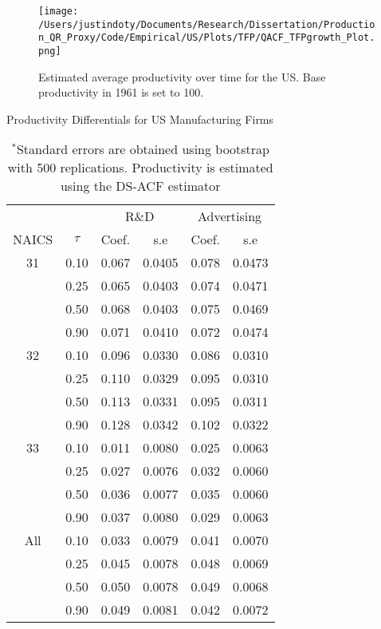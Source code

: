 \documentclass[11pt]{article}
\begin{document}
\begin{figure}[H]
\centering
\texttt{[image: /Users/justindoty/Documents/Research/Dissertation/Production\_QR\_Proxy/Code/Empirical/US/Plots/TFP/QACF\_TFPgrowth\_Plot.png]}
\caption{Estimated average productivity over time for the US. Base productivity in 1961 is set to 100.}
\label{fig:USpgrowth}
\end{figure}

\begin{table}[H]
\centering
\caption{Productivity Differentials for US Manufacturing Firms}
\begin{tabular}{cccccc}
  \hline\hline & & \multicolumn{2}{c}{R\&D}  & \multicolumn{2}{c}{Advertising} \\ \cmidrule(lr){3-4} \cmidrule(lr){5-6}NAICS & $\tau$ & Coef. & s.e & Coef. & s.e \\ 
  \hline
31 & 0.10 & 0.067 & 0.0405 & 0.078 & 0.0473 \\ 
   & 0.25 & 0.065 & 0.0403 & 0.074 & 0.0471 \\ 
   & 0.50 & 0.068 & 0.0403 & 0.075 & 0.0469 \\ 
   & 0.90 & 0.071 & 0.0410 & 0.072 & 0.0474 \\ 
  32 & 0.10 & 0.096 & 0.0330 & 0.086 & 0.0310 \\ 
   & 0.25 & 0.110 & 0.0329 & 0.095 & 0.0310 \\ 
   & 0.50 & 0.113 & 0.0331 & 0.095 & 0.0311 \\ 
   & 0.90 & 0.128 & 0.0342 & 0.102 & 0.0322 \\ 
  33 & 0.10 & 0.011 & 0.0080 & 0.025 & 0.0063 \\ 
   & 0.25 & 0.027 & 0.0076 & 0.032 & 0.0060 \\ 
   & 0.50 & 0.036 & 0.0077 & 0.035 & 0.0060 \\ 
   & 0.90 & 0.037 & 0.0080 & 0.029 & 0.0063 \\ 
  All & 0.10 & 0.033 & 0.0079 & 0.041 & 0.0070 \\ 
   & 0.25 & 0.045 & 0.0078 & 0.048 & 0.0069 \\ 
   & 0.50 & 0.050 & 0.0078 & 0.049 & 0.0068 \\ 
   & 0.90 & 0.049 & 0.0081 & 0.042 & 0.0072 \\ 
   \hline
\end{tabular}
\caption*{\footnotesize $^{*}$Standard errors are obtained using bootstrap with 500 replications. Productivity is estimated using the DS-ACF estimator}
\end{table}
\end{document}
